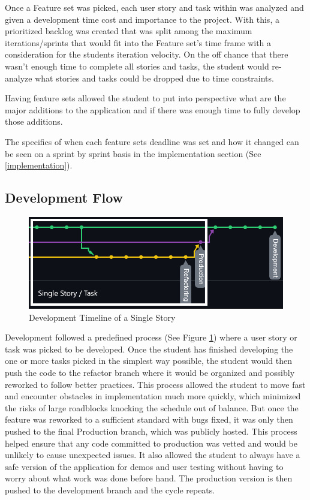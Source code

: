 Once a Feature set was picked, each user story and task within was analyzed and given a development time cost and importance to the project. With this, a prioritized backlog was created that was split among the maximum iterations/sprints that would fit into the Feature set's time frame with a consideration for the students iteration velocity. On the off chance that there wasn't enough time to complete all stories and tasks, the student would re-analyze what stories and tasks could be dropped due to time constraints.

Having feature sets allowed the student to put into perspective what are the major additions to the application and if there was enough time to fully develop those additions.

The specifics of when each feature sets deadline was set and how it changed can be seen on a sprint by sprint basis in the implementation section (See \ref{implementation}).

\subsection{Development Flow} \label{devflow}
\begin{figure}
    \centering
    \includegraphics[width=1\columnwidth]{author-files/figures/SingleStoryPath2.png}
    \caption{Development Timeline of a Single Story}
    \label{fig:singlestory}
\end{figure}

Development followed a predefined process (See Figure \ref{fig:singlestory}) where a user story or task was picked to be developed. Once the student has finished developing the one or more tasks picked in the simplest way possible, the student would then push the code to the refactor branch where it would be organized and possibly reworked to follow better practices. This process allowed the student to move fast and encounter obstacles in implementation much more quickly, which minimized the risks of large roadblocks knocking the schedule out of balance. But once the feature was reworked to a sufficient standard with bugs fixed, it was only then pushed to the final Production branch, which was publicly hosted.
This process helped ensure that any code committed to production was vetted and would be unlikely to cause unexpected issues. It also allowed the student to always have a safe version of the application for demos and user testing without having to worry about what work was done before hand.
The production version is then pushed to the development branch and the cycle repeats.


